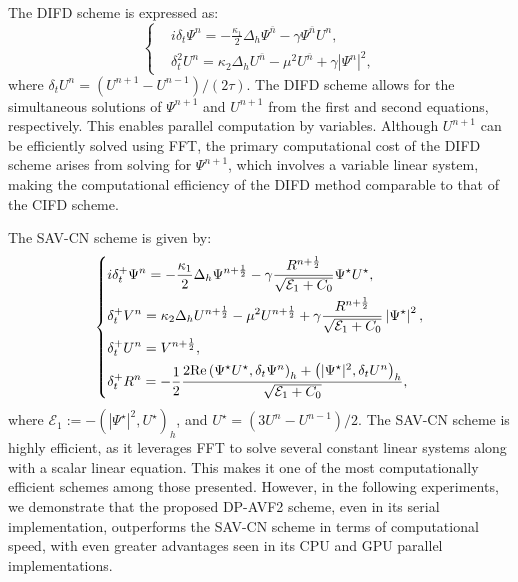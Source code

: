 \documentclass[fleqn,11pt]{elsarticle}
\numberwithin{equation}{section}
\begin{document}
The DIFD scheme is expressed as:
\begin{equation}\label{difd}
\left\lbrace
\begin{aligned}
 & i \delta_{t} \Psi^n = -\frac{\kappa_1}{2}\Delta_h\Psi^{\bar{n}} - \gamma \Psi^{\bar{n}} U^n, \\
 & \delta_t^2 U^n = \kappa_2 \Delta_h U^{\bar{n}} - \mu^2 U^{\overline{n}} + \gamma |\Psi^n|^2,
\end{aligned}
\right.
\end{equation}
where $ \delta_{t} U^n = (U^{n+1} - U^{n-1})/(2\tau)$. The DIFD scheme allows for the simultaneous solutions of $ \Psi^{n+1} $ and $ U^{n+1} $ from the first and second equations, respectively. This enables parallel computation by variables. Although $ U^{n+1} $ can be efficiently solved using FFT, the primary computational cost of the DIFD scheme arises from solving for $ \Psi^{n+1} $, which involves a variable linear system, making the computational efficiency of the DIFD method comparable to that of the CIFD scheme.

The SAV-CN scheme is given by:
\begin{equation*}
\left\lbrace
\begin{aligned}
 & i \delta_{t}^+ \Psi^{n}  = -\frac{\kappa_1}{2} \Delta_h \Psi^{n+\frac{1}{2}} - \gamma \frac{ R^{n+\frac{1}{2}}}{\sqrt{\mathcal{E}_1+C_0}}\Psi^{\star} U^{\star}, \\
 & \delta_{t}^+ V^{n} =  \kappa_2 \Delta_h U^{n+\frac{1}{2}} - \mu^2 U^{n+\frac{1}{2}} + \gamma \frac{ R^{n+\frac{1}{2}}}{\sqrt{\mathcal{E}_1+C_0}}\left|\Psi^{\star}\right|^2, \\
 & \delta_{t}^+ U^{n} = V^{n+\frac{1}{2}}, \\
 & \delta_{t}^+ R^{n} = - \frac{ 1 }{2} \frac{ 2{\rm Re} \left( \Psi^{\star} U^{\star}, \delta_t \Psi^{n} \right)_h + \left(|\Psi^{\star}|^2, \delta_t U^{n} \right)_h }{\sqrt{\mathcal{E}_1+C_0}},
\end{aligned}
\right.
\end{equation*}
where $\mathcal{E}_1 := -\left(|\Psi^{\star}|^2, U^{\star}\right)_h$, and  $U^{\star} = (3U^n - U^{n-1})/2$. The SAV-CN scheme is highly efficient, as it leverages FFT to solve several constant linear systems along with a scalar linear equation. This makes it one of the most computationally efficient schemes among those presented. However, in the following experiments, we demonstrate that the proposed DP-AVF2 scheme, even in its serial implementation, outperforms the SAV-CN scheme in terms of computational speed, with even greater advantages seen in its CPU and GPU parallel implementations.
\end{document}
